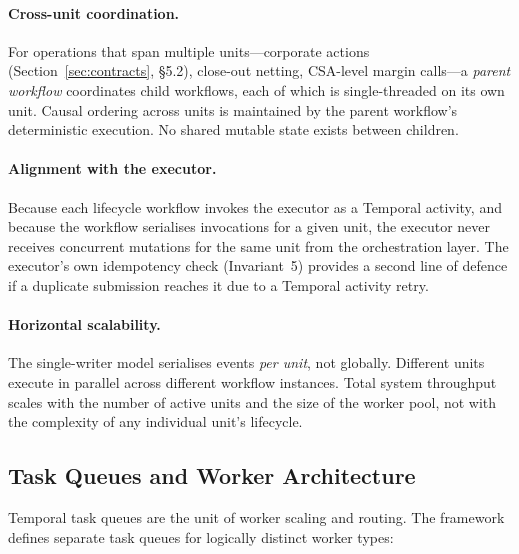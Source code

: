 \documentclass[11pt,a4paper]{article}
\begin{document}
\paragraph{Cross-unit coordination.}
For operations that span multiple units---corporate actions (Section~\ref{sec:contracts}, \S5.2), close-out netting, CSA-level margin calls---a \emph{parent workflow} coordinates child workflows, each of which is single-threaded on its own unit. Causal ordering across units is maintained by the parent workflow's deterministic execution. No shared mutable state exists between children.

\paragraph{Alignment with the executor.}
Because each lifecycle workflow invokes the executor as a Temporal activity, and because the workflow serialises invocations for a given unit, the executor never receives concurrent mutations for the same unit from the orchestration layer. The executor's own idempotency check (Invariant~5) provides a second line of defence if a duplicate submission reaches it due to a Temporal activity retry.

\paragraph{Horizontal scalability.}
The single-writer model serialises events \emph{per unit}, not globally. Different units execute in parallel across different workflow instances. Total system throughput scales with the number of active units and the size of the worker pool, not with the complexity of any individual unit's lifecycle.

\subsection{Task Queues and Worker Architecture}
\label{sec:temporal-taskqueues}

Temporal task queues are the unit of worker scaling and routing. The framework defines separate task queues for logically distinct worker types:
\end{document}
